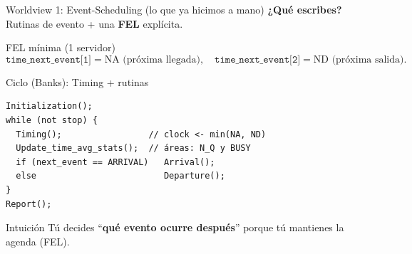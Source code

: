 \documentclass[aspectratio=1610, 9pt]{beamer}
\begin{document}
\begin{frame}[fragile]{Worldview 1: Event-Scheduling (lo que ya hicimos a mano)}
\small
\textbf{¿Qué escribes?} Rutinas de evento + una \textbf{FEL} explícita.

\vspace{2pt}
\begin{block}{FEL mínima (1 servidor)}
\[
\texttt{time\_next\_event[1]}=\text{NA (próxima llegada)},\quad
\texttt{time\_next\_event[2]}=\text{ND (próxima salida)}.
\]
\end{block}

\vspace{2pt}
\begin{block}{Ciclo (Banks): Timing + rutinas}
\end{block}
\begin{verbatim}
Initialization();
while (not stop) {
  Timing();                 // clock <- min(NA, ND)
  Update_time_avg_stats();  // áreas: N_Q y BUSY
  if (next_event == ARRIVAL)   Arrival();
  else                         Departure();
}
Report();
\end{verbatim}

\vspace{2pt}
\begin{block}{Intuición}
Tú decides “\textbf{qué evento ocurre después}” porque tú mantienes la agenda (FEL).
\end{block}
\end{frame}
\end{document}
